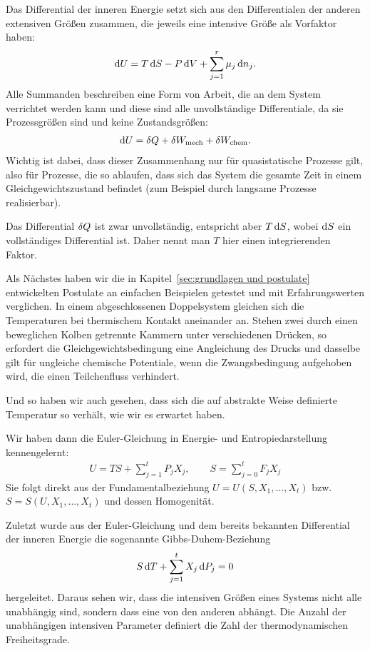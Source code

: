 \begin{summary}
    Das Differential der inneren Energie setzt sich aus den Differentialen der anderen extensiven Größen zusammen, die jeweils eine intensive Größe als Vorfaktor haben:
    \begin{align*}
        \mathop{}\!\mathrm{d} U = T \mathop{}\!\mathrm{d} S - P \mathop{}\!\mathrm{d} V + \sum_{j=1}^r \mu_j \mathop{}\!\mathrm{d} n_j.
    \end{align*}
    Alle Summanden beschreiben eine Form von Arbeit, die an dem System verrichtet werden kann und diese sind alle unvollständige Differentiale, da sie Prozessgrößen sind und keine Zustandsgrößen:
    \begin{align*}
        \mathop{}\!\mathrm{d} U = \mathop{}\!\delta Q + \mathop{}\!\delta W_\mathrm{mech} + \mathop{}\!\delta W_\mathrm{chem}.
    \end{align*}
    Wichtig ist dabei, dass dieser Zusammenhang nur für quasistatische Prozesse gilt, also für Prozesse, die so ablaufen, dass sich das System die gesamte Zeit in einem Gleichgewichtszustand befindet (zum Beispiel durch langsame Prozesse realisierbar). 

    Das Differential $\mathop{}\!\delta Q$ ist zwar unvollständig, entspricht aber $T\mathop{}\!\mathrm{d} S$, wobei $\mathop{}\!\mathrm{d} S$ ein vollständiges Differential ist. Daher nennt man $T$ hier einen integrierenden Faktor.

    Als Nächstes haben wir die in Kapitel~\ref{sec:grundlagen und postulate} entwickelten Postulate an einfachen Beispielen getestet und mit Erfahrungswerten verglichen. In einem abgeschlossenen Doppelsystem gleichen sich die Temperaturen bei thermischem Kontakt aneinander an. Stehen zwei durch einen beweglichen Kolben getrennte Kammern unter verschiedenen Drücken, so erfordert die Gleichgewichtsbedingung eine Angleichung des Drucks und dasselbe gilt für ungleiche chemische Potentiale, wenn die Zwangsbedingung aufgehoben wird, die einen Teilchenfluss verhindert. 

    Und so haben wir auch gesehen, dass sich die auf abstrakte Weise definierte Temperatur so verhält, wie wir es erwartet haben. 

    Wir haben dann die Euler-Gleichung in Energie- und Entropiedarstellung kennengelernt:
    \begin{align*}
        U = TS + \sum_{j=1}^t P_j X_j, \qquad S = \sum_{j=0}^t F_j X_j
    \end{align*}
    Sie folgt direkt aus der Fundamentalbeziehung $U=U(S, X_1,\dots,X_t)$ bzw. $S=S(U, X_1,\dots,X_t)$ und dessen Homogenität. 

    Zuletzt wurde aus der Euler-Gleichung und dem bereits bekannten Differential der inneren Energie die sogenannte Gibbs-Duhem-Beziehung
    \begin{align*}
        S\mathop{}\!\mathrm{d} T + \sum_{j=1}^t X_j \mathop{}\!\mathrm{d} P_j = 0
    \end{align*}
    hergeleitet. Daraus sehen wir, dass die intensiven Größen eines Systems nicht alle unabhängig sind, sondern dass eine von den anderen abhängt. Die Anzahl der unabhängigen intensiven Parameter definiert die Zahl der thermodynamischen Freiheitsgrade. 
\end{summary}